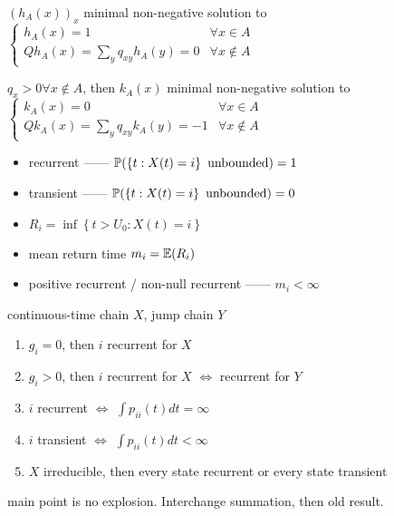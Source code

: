 \begin{thm}
    $(h_A(x))_x$ minimal non-negative solution to \\$
    \begin{cases}
        h_A(x) = 1 &\forall x \in A \\
        Qh_A(x) = \sum_y q_{xy}h_A(y) = 0 &\forall x \notin A
    \end{cases}$
\end{thm}

\begin{thm}
    $q_x > 0 \forall x \notin A$, then $k_A(x)$ minimal non-negative solution to\\$
    \begin{cases}
        k_A(x) = 0 & \forall x \in A\\
        Qk_A(x) = \sum_y q_{xy}k_A(y) = -1 &\forall x \notin A
    \end{cases}$
\end{thm}

\begin{itemize}
    \item recurrent ------ $\mathbb{P}(\left\{ t: X(t) = i \right\} \text{ unbounded}) = 1$
    \item transient ------ $\mathbb{P}(\left\{ t: X(t) = i \right\} \text{ unbounded}) = 0$
    \item $R_i = \inf \left\{ t > U_0 : X(t) = i \right\}$
    \item mean return time $m_i = \mathbb{E}(R_i)$
    \item positive recurrent / non-null recurrent ------ $m_i < \infty$
\end{itemize}

\begin{thm}
    continuous-time chain $X$, jump chain $Y$
    \begin{enumerate}
        \item $g_i = 0$, then $i$ recurrent for $X$
        \item $g_i > 0$, then $i$ recurrent for $X$ $\iff$ recurrent for $Y$
        \item $i$ recurrent $\iff$ $\int p_{ii}(t)dt = \infty$
        \item $i$ transient $\iff$ $\int p_{ii}(t)dt < \infty$
        \item $X$ irreducible, then every state recurrent or every state transient
    \end{enumerate}
\end{thm}
\begin{pf}
    main point is no explosion.
    Interchange summation, then old result.
\end{pf}

